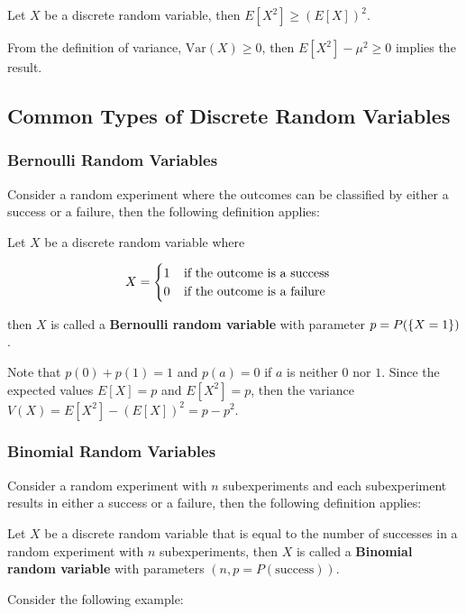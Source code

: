 \documentclass[a4paper,12pt]{article}
\begin{document}
\begin{crl}
  Let $X$ be a discrete random variable, then $E[X^{2}]\geq(E[X])^{2}$.\n

  \prf From the definition of variance, $\mathrm{Var}(X)\geq 0$, then $E[X^{2}]-\mu^{2}\geq 0$ implies the result.
\end{crl}

\subsection{Common Types of Discrete Random Variables}
\subsubsection{Bernoulli Random Variables}
Consider a random experiment where the outcomes can be classified by either a success or a failure, then the following definition applies:\n

\begin{dft}
  Let $X$ be a discrete random variable where

  $$X=\begin{cases}
    1\;\;\;\;\text{if the outcome is a success}\\
    0\;\;\;\;\text{if the outcome is a failure}
  \end{cases}$$\s

  then $X$ is called a \textbf{Bernoulli random variable} with parameter $p=P(\left\{ X=1\right\})$.
\end{dft}\n

Note that $p(0)+p(1)=1$ and $p(a)=0$ if $a$ is neither $0$ nor $1$. Since the expected values $E[X]=p$ and $E[X^{2}]=p$, then the variance $V(X)=E[X^{2}]-(E[X])^{2}=p-p^{2}$.

\subsubsection{Binomial Random Variables}
Consider a random experiment with $n$ subexperiments and each subexperiment results in either a success or a failure, then the following definition applies:\n

\begin{dft}
  Let $X$ be a discrete random variable that is equal to the number of successes in a random experiment with $n$ subexperiments, then $X$ is called a \textbf{Binomial random variable} with parameters $(n,p=P(\mathrm{success}))$.
\end{dft}\n

Consider the following example:\n
\end{document}
